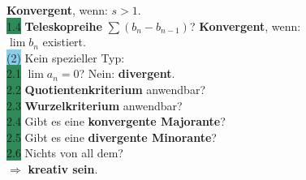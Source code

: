 \documentclass[landscape, 10pt]{article}
\begin{document}
\begin{multicols}{3}
                     \textbf{Konvergent}, wenn: \textcolor{NavyBlue}{$s>1$}.\\
              \colorbox{SeaGreen}{1.4} \textbf{Teleskopreihe} 
                     \textcolor{NavyBlue}{$\sum(b_n-b_{n-1})$}? 
                     \textbf{Konvergent}, wenn:\\
              \textcolor{NavyBlue}{$\lim b_n$} existiert.\\
       \colorbox{SkyBlue}{(2)} Kein spezieller Typ:\\
              \colorbox{SeaGreen}{2.1} \textcolor{NavyBlue}{$\lim a_n=0$}? 
                     Nein: \textbf{divergent}.\\
              \colorbox{SeaGreen}{2.2} \textbf{Quotientenkriterium} anwendbar?\\
              \colorbox{SeaGreen}{2.3} \textbf{Wurzelkriterium} anwendbar?\\
              \colorbox{SeaGreen}{2.4} Gibt es eine 
                     \textbf{konvergente Majorante}?\\
              \colorbox{SeaGreen}{2.5} Gibt es eine 
                     \textbf{divergente Minorante}?\\
              \colorbox{SeaGreen}{2.6} Nichts von all dem?\\
              $\Longrightarrow$ \textbf{kreativ sein}.\\

\end{multicols}
\end{document}
